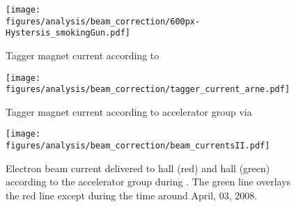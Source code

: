   
  \begin{figure}[h!]\begin{center}
  \texttt{[image: \\figures/analysis/beam\_correction/600px-Hystersis\_smokingGun.pdf]}
  \caption[Tagger magnet current according to ]{\label{fig:tag.magnet.epics}Tagger magnet current according to }
  \end{center}\end{figure}
  
  \begin{figure}[h!]\begin{center}
  \texttt{[image: \\figures/analysis/beam\_correction/tagger\_current\_arne.pdf]}
  \caption[Tagger magnet current according to accelerator group via ]{\label{fig:tag.magnet.arne} Tagger magnet current according to accelerator group via }
  \end{center}\end{figure}
  
  \begin{figure}[h!]\begin{center}
  \texttt{[image: \\figures/analysis/beam\_correction/beam\_currentsII.pdf]}
  \caption[Electron beam current delivered to hall (red) and hall  (green) according to the accelerator group during ]{\label{fig:beamcurrents}Electron beam current delivered to hall (red) and hall  (green) according to the accelerator group during . The green line overlays the red line except during the time around April, 03, 2008.}
  \end{center}\end{figure}
  
